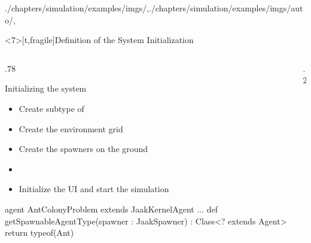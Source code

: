 \begin{graphicspathcontext}{{./chapters/simulation/examples/imgs/},{./chapters/simulation/examples/imgs/auto/},\old}
\begin{frame}<7>[t,fragile]{Definition of the System Initialization \insertcontinuationtext}
	\vspace{-.5cm}
	\smaller
	\begin{columns}
		\begin{column}[t]{.78\linewidth}
			{\smaller
			\begin{block}{Initializing the system}
				\begin{itemize}
				\item Create subtype of 
				\item Create the environment grid
				\item Create the spawners on the ground
				\item {}
				\item Initialize the UI and start the simulation
				\end{itemize}
			\end{block}}
			\begin{sarllisting}[basicstyle=\scriptsize]
agent AntColonyProblem extends JaakKernelAgent {
...
  def getSpawnableAgentType(spawner : JaakSpawner)
      : Class<? extends Agent> {
    return typeof(Ant)
  }
}
			\end{sarllisting}
		\end{column}
		\begin{column}[t]{.2\linewidth}
		\end{column}
	\end{columns}
\end{frame}


\end{graphicspathcontext}
